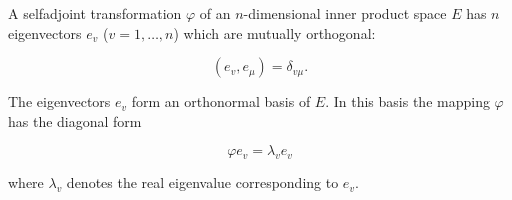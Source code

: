 A selfadjoint transformation $\varphi$ of an $n$-dimensional inner product space $E$ has $n$ eigenvectors $e_v$ ($v = 1, \ldots, n$) which are mutually orthogonal:

$$(e_v, e_\mu) = \delta_{v\mu}.$$

The eigenvectors $e_v$ form an orthonormal basis of $E$. In this basis the mapping $\varphi$ has the diagonal form

$$\varphi e_v = \lambda_v e_v$$

where $\lambda_v$ denotes the real eigenvalue corresponding to $e_v$.
